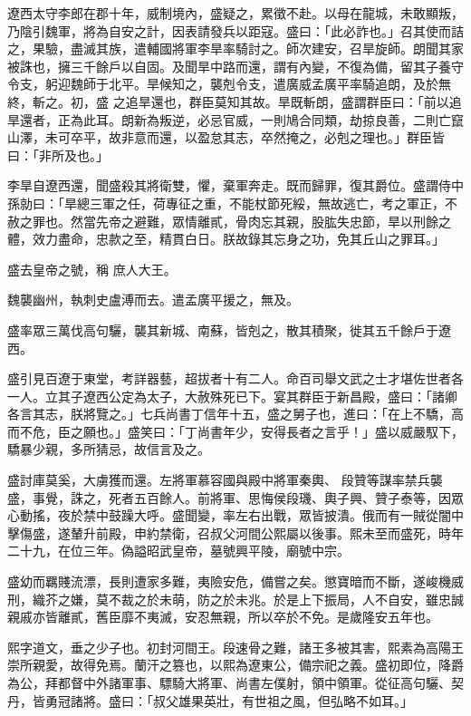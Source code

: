 \begin{pinyinscope}
 遼西太守李郎在郡十年，威制境內，盛疑之，累徵不赴。以母在龍城，未敢顯叛，乃陰引魏軍，將為自安之計，因表請發兵以距寇。盛曰：「此必詐也。」召其使而詰之，果驗，盡滅其族，遣輔國將軍李旱率騎討之。師次建安，召旱旋師。朗聞其家被誅也，擁三千餘戶以自固。及聞旱中路而還，謂有內變，不復為備，留其子養守令支，躬迎魏師于北平。旱候知之，襲剋令支，遣廣威孟廣平率騎追朗，及於無終，斬之。初，盛
 之追旱還也，群臣莫知其故。旱既斬朗，盛謂群臣曰：「前以追旱還者，正為此耳。朗新為叛逆，必忌官威，一則鳩合同類，劫掠良善，二則亡竄山澤，未可卒平，故非意而還，以盈怠其志，卒然掩之，必剋之理也。」群臣皆曰：「非所及也。」



 李旱自遼西還，聞盛殺其將衛雙，懼，棄軍奔走。既而歸罪，復其爵位。盛謂侍中孫勍曰：「旱總三軍之任，荷專征之重，不能杖節死綏，無故逃亡，考之軍正，不赦之罪也。然當先帝之避難，眾情離貳，骨肉忘其親，股肱失忠節，旱以刑餘之體，效力盡命，忠款之至，精貫白日。朕故錄其忘身之功，免其丘山之罪耳。」



 盛去皇帝之號，稱
 庶人大王。



 魏襲幽州，執刺史盧溥而去。遣孟廣平援之，無及。



 盛率眾三萬伐高句驪，襲其新城、南蘇，皆剋之，散其積聚，徙其五千餘戶于遼西。



 盛引見百遼于東堂，考詳器藝，超拔者十有二人。命百司舉文武之士才堪佐世者各一人。立其子遼西公定為太子，大赦殊死已下。宴其群臣于新昌殿，盛曰：「諸卿各言其志，朕將覽之。」七兵尚書丁信年十五，盛之舅子也，進曰：「在上不驕，高而不危，臣之願也。」盛笑曰：「丁尚書年少，安得長者之言乎！」盛以威嚴馭下，驕暴少親，多所猜忌，故信言及之。



 盛討庫莫奚，大虜獲而還。左將軍慕容國與殿中將軍秦輿、
 段贊等謀率禁兵襲盛，事覺，誅之，死者五百餘人。前將軍、思悔侯段璣、輿子興、贊子泰等，因眾心動搖，夜於禁中鼓躁大呼。盛聞變，率左右出戰，眾皆披潰。俄而有一賊從闇中擊傷盛，遂輦升前殿，申約禁衛，召叔父河間公熙屬以後事。熙未至而盛死，時年二十九，在位三年。偽謚昭武皇帝，墓號興平陵，廟號中宗。



 盛幼而羈賤流漂，長則遭家多難，夷險安危，備嘗之矣。懲寶暗而不斷，遂峻機威刑，織芥之嫌，莫不裁之於未萌，防之於未兆。於是上下振局，人不自安，雖忠誠親戚亦皆離貳，舊臣靡不夷滅，安忍無親，所以卒於不免。是歲隆安五年也。



 熙字道文，垂之少子也。初封河間王。段速骨之難，諸王多被其害，熙素為高陽王崇所親愛，故得免焉。蘭汗之篡也，以熙為遼東公，備宗祀之義。盛初即位，降爵為公，拜都督中外諸軍事、驃騎大將軍、尚書左僕射，領中領軍。從征高句驪、契丹，皆勇冠諸將。盛曰：「叔父雄果英壯，有世祖之風，但弘略不如耳。」




\end{pinyinscope}
